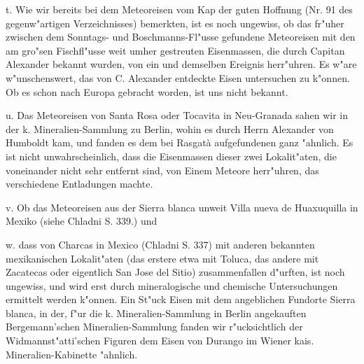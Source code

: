 \documentclass[a4paper, 11pt, oneside, polutonikogreek, german]{article}
\begin{document}
t. Wie wir bereits bei dem Meteoreisen vom Kap der guten Hoffnung (Nr. 91 des gegenw"artigen Verzeichnisses) bemerkten, ist es noch ungewiss, ob das fr"uher zwischen dem Sonntags- und Boschmanns-Fl"usse gefundene Meteoreisen mit den am gro"sen Fischfl"usse weit umher gestreuten Eisenmassen, die durch Capitan Alexander bekannt wurden, von ein und demselben Ereignis herr"uhren. Es w"are w"unschenswert, das von C. Alexander entdeckte Eisen untersuchen zu k"onnen. Ob es schon nach Europa gebracht worden, ist uns nicht bekannt.

u. Das Meteoreisen von Santa Rosa oder Tocavita in Neu-Granada sahen wir in der k. Mineralien-Sammlung zu Berlin, wohin es durch Herrn Alexander von Humboldt kam, und fanden es dem bei Rasgatà aufgefundenen ganz "ahnlich. Es ist nicht unwahrscheinlich, dass die Eisenmassen dieser zwei Lokalit"aten, die voneinander nicht sehr entfernt sind, von Einem Meteore herr"uhren, das verschiedene Entladungen machte.

v. Ob das Meteoreisen aus der Sierra blanca unweit Villa nueva de Huaxuquilla in Mexiko (siehe Chladni S. 339.) und

w. dass von Charcas in Mexico (Chladni S. 337) mit anderen bekannten mexikanischen Lokalit"aten (das erstere etwa mit Toluca, das andere mit Zacatecas oder eigentlich San Jose del Sitio) zusammenfallen d"urften, ist noch ungewiss, und wird erst durch mineralogische und chemische Untersuchungen ermittelt werden k"onnen. Ein St"uck Eisen mit dem angeblichen Fundorte Sierra blanca, in der, f"ur die k. Mineralien-Sammlung in Berlin angekauften Bergemann'schen Mineralien-Sammlung fanden wir r"ucksichtlich der Widmannst"atti'schen Figuren dem Eisen von Durango im Wiener kais. Mineralien-Kabinette "ahnlich.
\clearpage
\end{document}
